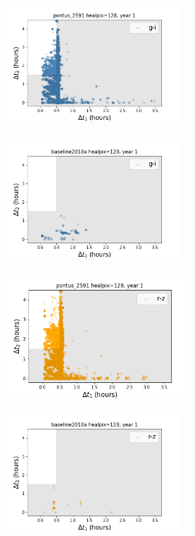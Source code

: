 \documentclass[12pt, letterpaper]{article}
\begin{document}
\begin{figure}[!ht]
\begin{center}
\includegraphics[width=6.5cm,height=5cm]{figures/3visits_pontus_2591_gi.png}
\includegraphics[width=6.5cm,height=5cm]{figures/3visits_baseline2018a_gi.png}
\includegraphics[width=6.91cm,height=5cm]{figures/3visits_pontus_2591_rz.png}
\includegraphics[width=6.5cm,height=5cm]{figures/3visits_baseline2018a_rz.png}

\end{center}
\end{figure}
\end{document}

